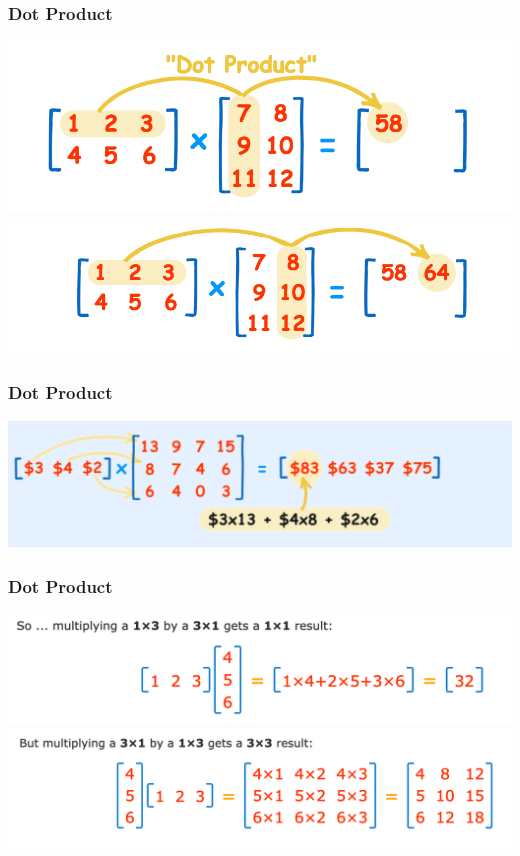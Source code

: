 \documentclass[t, 11pt]{beamer}
\begin{document}
\begin{frame} 
	\frametitle{\insertsection} 
	\frametitle{Dot Product} 
	\includegraphics[scale=0.6]{funmath1}	
	\includegraphics[scale=0.6]{funmath2}	
\end{frame}	

\begin{frame} 
	\frametitle{\insertsection} 
	\frametitle{Dot Product} 
	\includegraphics[scale=0.4]{funmath3}	
\end{frame}	

\begin{frame} 
	\frametitle{\insertsection} 
	\frametitle{Dot Product} 
	\includegraphics[scale=0.5]{funmath4}	
	\includegraphics[scale=0.5]{funmath5}	
\end{frame}	
\end{document}
